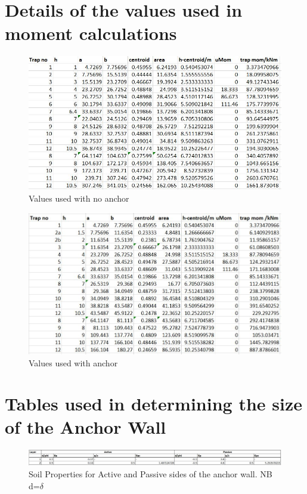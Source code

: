 \documentclass[12pt, a4paper]{article}
\begin{document}
\begin{appendices}
\section{Details of the values used in moment calculations}
\begin{figure}[H]
\hspace*{-1cm}
  \centering
  	\includegraphics[width=0.75\textheight]{bendingmomentscalcstable}
   	\caption{Values used with no anchor}
	\label{bendmomtab}
\end{figure}
\begin{figure}[H]
\hspace*{-1cm}
  \centering
  	\includegraphics[width=0.75\textheight]{anchorbmcalcs}
   	\caption{Values used with anchor}
	\label{bendmomtab}
\end{figure}

\section{Tables used in determining the size of the Anchor Wall}

\begin{figure}[H]
  \centering
  	\includegraphics[width=0.7\textheight]{anchorwall1}
   	\caption{Soil Properties for Active and Passive sides of the anchor wall. NB d=$\delta$}
	\label{anchor1}
\end{figure}



\end{appendices}
\end{document}
